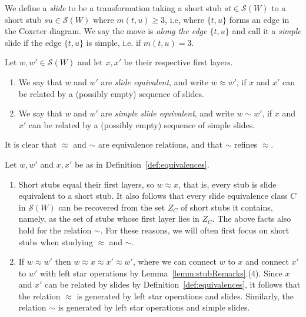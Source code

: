 \documentclass[ALCO,Unicode,published]{cedram}
\newcommand{\sw}{\mathcal{S}(W)}
\begin{document}
\begin{definition}
    \label{def:slidings} We define a \emph{slide} to be a transformation taking a short stub $st\in
          \sw$ to a short stub $su\in \sw$ where $m(t,u)\ge 3$, i.e, where $\{t,u\}$ forms an edge
          in the Coxeter diagram. We say the move is \emph{along the edge $\{t,u\}$} and call it a
          \emph{simple} slide if the edge $\{t,u\}$ is simple, i.e. if $m(t,u)=3$.  
\end{definition}
\begin{definition}
    \label{def:equivalences} Let $w,w'\in \sw$ and let $x,x'$ be their respective first layers.
    \begin{enumerate}
    \item We say that $w$ and $w'$ are \emph{slide equivalent}, and write $w\approx w'$, if $x$ and
         $x'$ can be related by a (possibly empty) sequence of slides. 
    \item We say that $w$ and $w'$ are \emph{simple slide equivalent}, and write $w\sim w'$, if $x$
         and $x'$ can be related by a (possibly empty) sequence of simple slides.
    \end{enumerate}
\end{definition}

It is clear that $\approx$ and $\sim$ are equivalence relations, and that $\sim$ refines $\approx$. 

\begin{remark}
\label{rmk:slidings}
Let $w,w'$ and $x,x'$ be as in Definition~\ref{def:equivalences}. 
\begin{enumerate}
\item Short stubs equal their first layers, so $w\approx x$, that is, every stub is slide equivalent
     to a short stub.  It also follows that every slide equivalence class $C$ in $\sw$ can be
     recovered from the set $Z_C$ of short stubs it contains, namely, as the set of stubs whose
     first layer lies in $Z_C$. The above facts also hold for the relation $\sim$.  For these
     reasons, we will often first focus on short stubs when studying $\approx$ and $\sim$.
\item If $w\approx w'$ then $w\approx x\approx x'\approx w'$, where we can connect $w$ to $x$ and
     connect $x'$ to $w'$ with left star operations by Lemma~\ref{lemm:stubRemarks}.(4).  Since $x$ and
     $x'$ can be related by slides by Definition~\ref{def:equivalences}, it follows that  the relation
     $\approx$ is generated by left star operations and slides.  Similarly, the relation $\sim$ is
     generated by left star operations and simple slides.
\end{enumerate} 
\end{remark}
\end{document}
